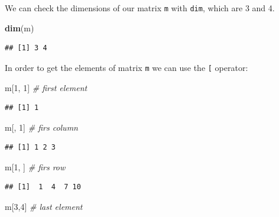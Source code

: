 \documentclass[12pt,graybox,envcountchap,sectrefs]{krantz}
\makeatletter
\newenvironment{Shaded}{\begin{snugshade}}{\end{snugshade}}
\newcommand{\KeywordTok}[1]{\textcolor[rgb]{0.13,0.29,0.53}{\textbf{#1}}}
\newcommand{\DecValTok}[1]{\textcolor[rgb]{0.00,0.00,0.81}{#1}}
\newcommand{\CommentTok}[1]{\textcolor[rgb]{0.56,0.35,0.01}{\textit{#1}}}
\newcommand{\NormalTok}[1]{#1}
\newenvironment{kframe}{%
\medskip{}
\setlength{\fboxsep}{.8em}
 \def\at@end@of@kframe{}%
 \ifinner\ifhmode%
  \def\at@end@of@kframe{\end{minipage}}%
  \begin{minipage}{\columnwidth}%
 \fi\fi%
 \def\FrameCommand##1{\hskip\@totalleftmargin \hskip-\fboxsep
 \colorbox{shadecolor}{##1}\hskip-\fboxsep
     \hskip-\linewidth \hskip-\@totalleftmargin \hskip\columnwidth}%
 \MakeFramed {\advance\hsize-\width
   \@totalleftmargin\z@ \linewidth\hsize
   \@setminipage}}%
 {\par\unskip\endMakeFramed%
 \at@end@of@kframe}
\renewenvironment{Shaded}{\begin{kframe}}{\end{kframe}}
\theoremstyle{definition}
\theoremstyle{definition}
\theoremstyle{definition}
\theoremstyle{remark}
\makeatother
\begin{document}
We can check the dimensions of our matrix \texttt{m} with \texttt{dim},
which are 3 and 4.

\begin{Shaded}
\begin{Highlighting}[]
\KeywordTok{dim}\NormalTok{(m)}
\end{Highlighting}
\end{Shaded}

\begin{verbatim}
## [1] 3 4
\end{verbatim}

In order to get the elements of matrix \texttt{m} we can use the
\texttt{{[}} operator:

\begin{Shaded}
\begin{Highlighting}[]
\NormalTok{m[}\DecValTok{1}\NormalTok{, }\DecValTok{1}\NormalTok{] }\CommentTok{# first element}
\end{Highlighting}
\end{Shaded}

\begin{verbatim}
## [1] 1
\end{verbatim}

\begin{Shaded}
\begin{Highlighting}[]
\NormalTok{m[, }\DecValTok{1}\NormalTok{]  }\CommentTok{# firs column}
\end{Highlighting}
\end{Shaded}

\begin{verbatim}
## [1] 1 2 3
\end{verbatim}

\begin{Shaded}
\begin{Highlighting}[]
\NormalTok{m[}\DecValTok{1}\NormalTok{, ]  }\CommentTok{# firs row}
\end{Highlighting}
\end{Shaded}

\begin{verbatim}
## [1]  1  4  7 10
\end{verbatim}

\begin{Shaded}
\begin{Highlighting}[]
\NormalTok{m[}\DecValTok{3}\NormalTok{,}\DecValTok{4}\NormalTok{]  }\CommentTok{# last element}
\end{Highlighting}
\end{Shaded}
\end{document}
